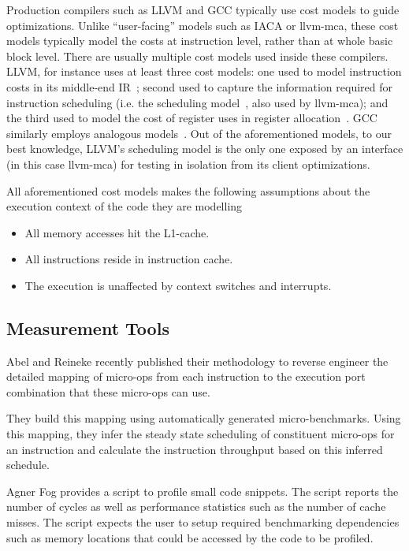 Production compilers such as LLVM\cite{llvm} and GCC typically use cost models 
to guide optimizations.
Unlike ``user-facing'' models such as IACA or llvm-mca, these cost models typically
model the costs at instruction level, rather than at whole basic block level.
There are usually multiple cost models used inside these compilers.
LLVM, for instance uses at least three cost models: 
one used to model instruction costs in its middle-end IR~\cite{llvm-cost};
second used to capture the information required for instruction scheduling 
(i.e. the scheduling model~\cite{llvm-sched}, also used by llvm-mca);
and the third used to model the cost of register uses in register allocation~\cite{llvm-reg}.
GCC similarly employs analogous models~\cite{gcc-cost,gcc-sched}.
Out of the aforementioned models, to our best knowledge, 
LLVM's scheduling model is the only one exposed by an interface
(in this case llvm-mca) for testing in isolation from its client optimizations.

All aforementioned cost models makes the following assumptions about the execution context
of the code they are modelling
\begin{itemize}
    \item All memory accesses hit the L1-cache.
    \item All instructions reside in instruction cache.
    \item The execution is unaffected by context switches and interrupts.
\end{itemize}

\subsection{Measurement Tools}
Abel and Reineke\cite{uops} recently published their methodology
to reverse engineer the detailed mapping of micro-ops
from each instruction to the execution port combination
that these micro-ops can use.

They build this mapping using automatically generated micro-benchmarks.
Using this mapping, they infer the steady state scheduling of constituent
micro-ops for an instruction and calculate the instruction throughput based on
this inferred schedule.

Agner Fog\cite{agner} provides a script to profile small code snippets.
The script reports the number of cycles as well as performance statistics such as 
the number of cache misses.
The script expects the user to setup required benchmarking dependencies such as 
memory locations that could be accessed by the code to be profiled.


